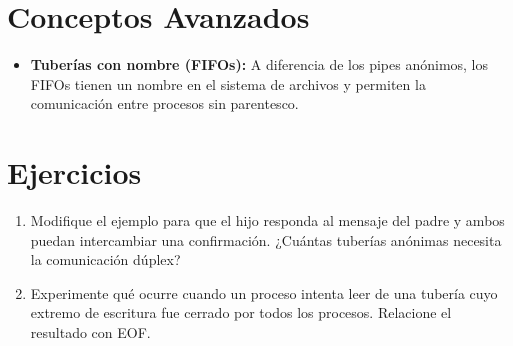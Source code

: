 \documentclass[12pt,a4paper]{article}
\begin{document}
\section{Conceptos Avanzados}
\begin{itemize}
    \item \textbf{Tuberías con nombre (FIFOs):} A diferencia de los pipes anónimos, los FIFOs tienen un nombre en el sistema de archivos y permiten la comunicación entre procesos sin parentesco.
\end{itemize}

\section{Ejercicios}
\begin{enumerate}
    \item Modifique el ejemplo para que el hijo responda al mensaje del padre y ambos puedan intercambiar una confirmación. ¿Cuántas tuberías anónimas necesita la comunicación dúplex?
    \item Experimente qué ocurre cuando un proceso intenta leer de una tubería cuyo extremo de escritura fue cerrado por todos los procesos. Relacione el resultado con EOF.
\end{enumerate}
\end{document}
